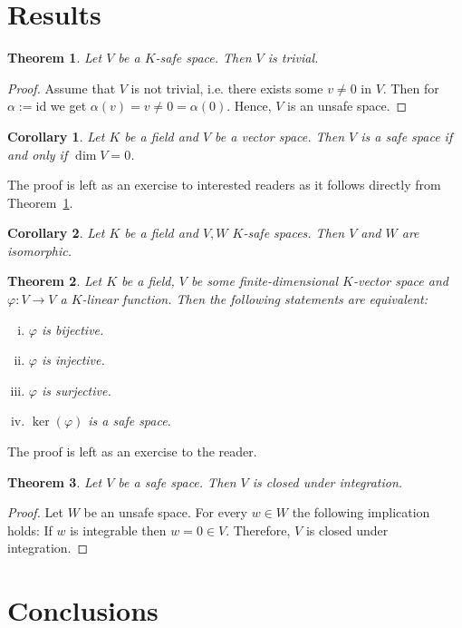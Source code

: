 \documentclass[]{article}
\newtheorem{theorem}{Theorem}
\newtheorem{corollary}{Corollary}
\begin{document}
\section{Results}

\begin{theorem}\label{thm:safe-space-trivial}
	Let $V$ be a $K$-safe space. Then $V$ is trivial.
\end{theorem}
\begin{proof}
	Assume that $V$ is not trivial, i.e. there exists some $v \neq 0$ in $V$. Then for $\alpha := \text{id}$ we get $\alpha(v) = v \neq 0 = \alpha(0)$. Hence, $V$ is an unsafe space.
\end{proof}

\begin{corollary}\label{cor:safe-space-dim0}
	Let $K$ be a field and $V$ be a vector space. Then $V$ is a safe space if and only if $\dim V = 0$.
\end{corollary}
The proof is left as an exercise to interested readers as it follows directly from Theorem~\ref{thm:safe-space-trivial}.

\begin{corollary}
	Let $K$ be a field and $V, W$ $K$-safe spaces. Then $V$ and $W$ are isomorphic.
\end{corollary}

\begin{theorem}
	Let $K$ be a field, $V$ be some finite-dimensional $K$-vector space and $\varphi : V \to V$ a $K$-linear function. Then the following statements are equivalent:
	\begin{enumerate}[(i)]
		\item $\varphi$ is bijective.
		\item $\varphi$ is injective.
		\item $\varphi$ is surjective.
		\item $\ker(\varphi)$ is a safe space.
	\end{enumerate}
\end{theorem}

The proof is left as an exercise to the reader.

\begin{theorem}
	Let $V$ be a safe space. Then $V$ is closed under integration.

\end{theorem}

\begin{proof}
	Let $W$ be an unsafe space. For every $w \in W$ the following implication holds: If $w$ is integrable then $w = 0 \in V$. Therefore, $V$ is closed under integration.
\end{proof}


\section{Conclusions}
\end{document}
